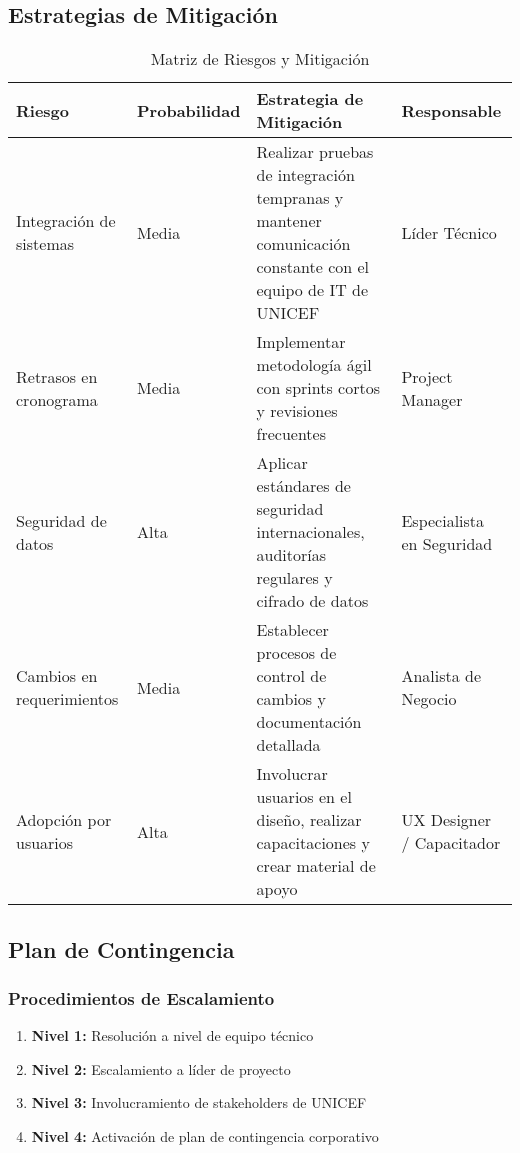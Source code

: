 \subsection{Estrategias de Mitigación}

\begin{table}[h]
\centering
\begin{tabular}{|p{3cm}|p{2cm}|p{5cm}|p{4cm}|}
\hline
\textbf{Riesgo} & \textbf{Probabilidad} & \textbf{Estrategia de Mitigación} & \textbf{Responsable} \\
\hline
Integración de sistemas & Media & Realizar pruebas de integración tempranas y mantener comunicación constante con el equipo de IT de UNICEF & Líder Técnico \\
\hline
Retrasos en cronograma & Media & Implementar metodología ágil con sprints cortos y revisiones frecuentes & Project Manager \\
\hline
Seguridad de datos & Alta & Aplicar estándares de seguridad internacionales, auditorías regulares y cifrado de datos & Especialista en Seguridad \\
\hline
Cambios en requerimientos & Media & Establecer procesos de control de cambios y documentación detallada & Analista de Negocio \\
\hline
Adopción por usuarios & Alta & Involucrar usuarios en el diseño, realizar capacitaciones y crear material de apoyo & UX Designer / Capacitador \\
\hline
\end{tabular}
\caption{Matriz de Riesgos y Mitigación}
\end{table}

\subsection{Plan de Contingencia}

\subsubsection{Procedimientos de Escalamiento}
\begin{enumerate}
    \item \textbf{Nivel 1:} Resolución a nivel de equipo técnico
    \item \textbf{Nivel 2:} Escalamiento a líder de proyecto
    \item \textbf{Nivel 3:} Involucramiento de stakeholders de UNICEF
    \item \textbf{Nivel 4:} Activación de plan de contingencia corporativo
\end{enumerate}


